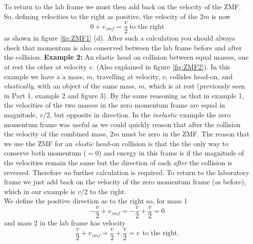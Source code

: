 \noindent To return to the lab frame we must then add back on the velocity of the ZMF. So, defining velocities to the right as positive, the velocity of the $2m$ is now
\begin{equation}
0+v_{zmf}=\frac{v}{2} \ \mbox{to the right}
\end{equation}
as shown in figure \ref{fig:ZMF1} (d).  After such a calculation you should always check that momentum is also conserved between the lab frame before and after the collision. 
\nll
{\bf Example 2:} An elastic head on collision between equal masses, one at rest the other at velocity $v$. (Also explained in figure \ref{fig:ZMF2}).
\nll
In this example we have a a mass, $m$, travelling at velocity, $v$, collides head-on, and {\it elastically}, with an object of the same mass, $m$, which is at rest (previously seen in Part 1, example 2 and figure 3).
\nll
By the same reasoning as that in example 1, the velocities of the two masses in the zero momentum frame are equal in magnitude, $v/2$, but opposite in direction.  In the {\it inelastic} example the zero momentum frame was useful as we could quickly reason that after the collision the velocity of the combined mass, $2m$ must be zero in the ZMF.  The reason that we use the ZMF for an {\it elastic} head-on collision is that the the only way to conserve both momentum ($=0$) and energy in this frame is if the magnitude of the velocities remain the same but the direction of each {\it after} the collision is reversed.  Therefore {\it no} further calculation is required.
\nll
To return to the laboratory frame we just add back on the velocity of the zero momentum frame (as before), which in our example is $v/2$ to the right. \\
\noindent We define the positive direction as to the right so, for mass 1
\begin{equation}
-\frac{v}{2}+v_{zmf}=-\frac{v}{2}+\frac{v}{2}=0
\end{equation}
and mass 2 in the lab frame has velocity
\begin{equation}
\frac{v}{2}+v_{zmf}=\frac{v}{2}+\frac{v}{2} =v\ \  \mbox{to the right}.
\end{equation}

